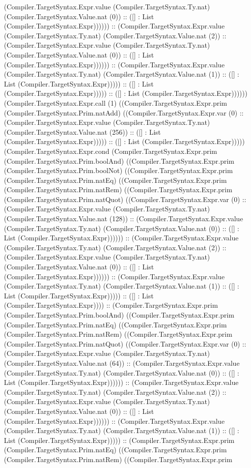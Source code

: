 \documentclass[11pt]{article}
\begin{document}
(Compiler.TargetSyntax.Expr.value (Compiler.TargetSyntax.Ty.nat) (Compiler.TargetSyntax.Value.nat (0)) :: ([] : List (Compiler.TargetSyntax.Expr)))))) :: (Compiler.TargetSyntax.Expr.value (Compiler.TargetSyntax.Ty.nat) (Compiler.TargetSyntax.Value.nat (2)) :: (Compiler.TargetSyntax.Expr.value (Compiler.TargetSyntax.Ty.nat) (Compiler.TargetSyntax.Value.nat (0)) :: ([] : List (Compiler.TargetSyntax.Expr)))))) :: (Compiler.TargetSyntax.Expr.value (Compiler.TargetSyntax.Ty.nat) (Compiler.TargetSyntax.Value.nat (1)) :: ([] : List (Compiler.TargetSyntax.Expr))))) :: ([] : List (Compiler.TargetSyntax.Expr))))) :: ([] : List (Compiler.TargetSyntax.Expr)))))) (Compiler.TargetSyntax.Expr.call (1) ((Compiler.TargetSyntax.Expr.prim (Compiler.TargetSyntax.Prim.natAdd) ((Compiler.TargetSyntax.Expr.var (0) :: (Compiler.TargetSyntax.Expr.value (Compiler.TargetSyntax.Ty.nat) (Compiler.TargetSyntax.Value.nat (256)) :: ([] : List (Compiler.TargetSyntax.Expr))))) :: ([] : List (Compiler.TargetSyntax.Expr))))) (Compiler.TargetSyntax.Expr.cond (Compiler.TargetSyntax.Expr.prim (Compiler.TargetSyntax.Prim.boolAnd) ((Compiler.TargetSyntax.Expr.prim (Compiler.TargetSyntax.Prim.boolNot) ((Compiler.TargetSyntax.Expr.prim (Compiler.TargetSyntax.Prim.natEq) ((Compiler.TargetSyntax.Expr.prim (Compiler.TargetSyntax.Prim.natRem) ((Compiler.TargetSyntax.Expr.prim (Compiler.TargetSyntax.Prim.natQuot) ((Compiler.TargetSyntax.Expr.var (0) :: (Compiler.TargetSyntax.Expr.value (Compiler.TargetSyntax.Ty.nat) (Compiler.TargetSyntax.Value.nat (128)) :: (Compiler.TargetSyntax.Expr.value (Compiler.TargetSyntax.Ty.nat) (Compiler.TargetSyntax.Value.nat (0)) :: ([] : List (Compiler.TargetSyntax.Expr)))))) :: (Compiler.TargetSyntax.Expr.value (Compiler.TargetSyntax.Ty.nat) (Compiler.TargetSyntax.Value.nat (2)) :: (Compiler.TargetSyntax.Expr.value (Compiler.TargetSyntax.Ty.nat) (Compiler.TargetSyntax.Value.nat (0)) :: ([] : List (Compiler.TargetSyntax.Expr)))))) :: (Compiler.TargetSyntax.Expr.value (Compiler.TargetSyntax.Ty.nat) (Compiler.TargetSyntax.Value.nat (1)) :: ([] : List (Compiler.TargetSyntax.Expr))))) :: ([] : List (Compiler.TargetSyntax.Expr)))) :: (Compiler.TargetSyntax.Expr.prim (Compiler.TargetSyntax.Prim.boolAnd) ((Compiler.TargetSyntax.Expr.prim (Compiler.TargetSyntax.Prim.natEq) ((Compiler.TargetSyntax.Expr.prim (Compiler.TargetSyntax.Prim.natRem) ((Compiler.TargetSyntax.Expr.prim (Compiler.TargetSyntax.Prim.natQuot) ((Compiler.TargetSyntax.Expr.var (0) :: (Compiler.TargetSyntax.Expr.value (Compiler.TargetSyntax.Ty.nat) (Compiler.TargetSyntax.Value.nat (64)) :: (Compiler.TargetSyntax.Expr.value (Compiler.TargetSyntax.Ty.nat) (Compiler.TargetSyntax.Value.nat (0)) :: ([] : List (Compiler.TargetSyntax.Expr)))))) :: (Compiler.TargetSyntax.Expr.value (Compiler.TargetSyntax.Ty.nat) (Compiler.TargetSyntax.Value.nat (2)) :: (Compiler.TargetSyntax.Expr.value (Compiler.TargetSyntax.Ty.nat) (Compiler.TargetSyntax.Value.nat (0)) :: ([] : List (Compiler.TargetSyntax.Expr)))))) :: (Compiler.TargetSyntax.Expr.value (Compiler.TargetSyntax.Ty.nat) (Compiler.TargetSyntax.Value.nat (1)) :: ([] : List (Compiler.TargetSyntax.Expr))))) :: (Compiler.TargetSyntax.Expr.prim (Compiler.TargetSyntax.Prim.natEq) ((Compiler.TargetSyntax.Expr.prim (Compiler.TargetSyntax.Prim.natRem) ((Compiler.TargetSyntax.Expr.prim 
\end{document}
